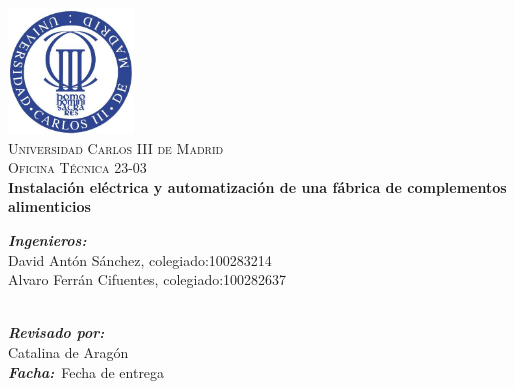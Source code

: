\begin{titlepage}

\begin{center}


\includegraphics[width=0.25\textwidth]{./uc3m.jpg}\\[2cm]    
\textsc{\huge Universidad Carlos III de Madrid}\\[0.5cm]
\textsc{\Large Oficina Técnica 23-03}\\[4cm]


{\LARGE \bfseries{Instalación eléctrica y automatización de una fábrica de complementos alimenticios}\\[4.5cm]}


\end{center}
\setlength{\parindent}{0cm}


\vspace{10pt}
\emph{\bfseries{Ingenieros:}}\\
David Antón Sánchez, colegiado:100283214\\
Alvaro Ferrán Cifuentes, colegiado:100282637\\\




\emph{\bfseries{Revisado por:}}\\
Catalina de Aragón\\




\emph{\bfseries{Facha:}}\ Fecha de entrega\\












\end{titlepage}